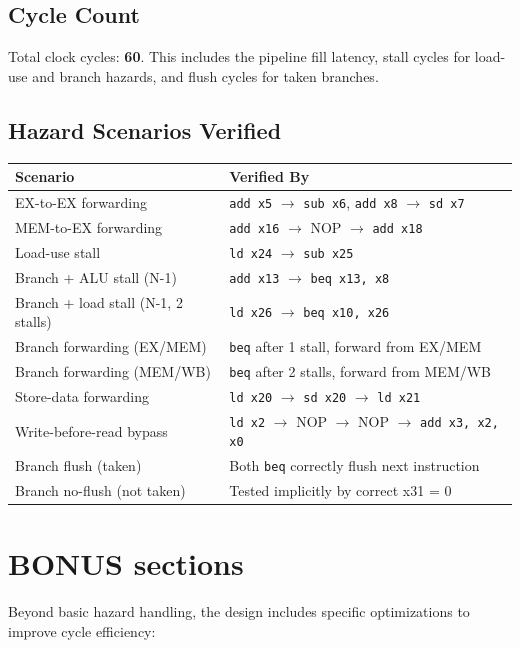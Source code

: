 \documentclass[12pt,a4paper]{article}
\begin{document}
\subsection{Cycle Count}
Total clock cycles: \textbf{60}. This includes the pipeline fill latency, stall cycles for load-use and branch hazards, and flush cycles for taken branches.

\subsection{Hazard Scenarios Verified}
\begin{center}
\begin{tabular}{p{5cm}p{9cm}}
    \toprule
    \textbf{Scenario} & \textbf{Verified By} \\
    \midrule
    EX-to-EX forwarding & \texttt{add x5} $\to$ \texttt{sub x6}, \texttt{add x8} $\to$ \texttt{sd x7} \\
    MEM-to-EX forwarding & \texttt{add x16} $\to$ NOP $\to$ \texttt{add x18} \\
    Load-use stall & \texttt{ld x24} $\to$ \texttt{sub x25} \\
    Branch + ALU stall (N-1) & \texttt{add x13} $\to$ \texttt{beq x13, x8} \\
    Branch + load stall (N-1, 2 stalls) & \texttt{ld x26} $\to$ \texttt{beq x10, x26} \\
    Branch forwarding (EX/MEM) & \texttt{beq} after 1 stall, forward from EX/MEM \\
    Branch forwarding (MEM/WB) & \texttt{beq} after 2 stalls, forward from MEM/WB \\
    Store-data forwarding & \texttt{ld x20} $\to$ \texttt{sd x20} $\to$ \texttt{ld x21} \\
    Write-before-read bypass & \texttt{ld x2} $\to$ NOP $\to$ NOP $\to$ \texttt{add x3, x2, x0} \\
    Branch flush (taken) & Both \texttt{beq} correctly flush next instruction \\
    Branch no-flush (not taken) & Tested implicitly by correct x31 = 0 \\
    \bottomrule
\end{tabular}
\end{center}

\section{BONUS sections}
Beyond basic hazard handling, the design includes specific optimizations to improve cycle efficiency:
\end{document}
